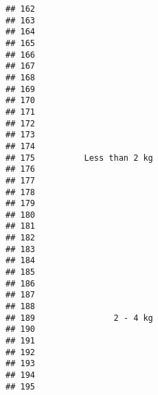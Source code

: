 \documentclass[
]{article}
\begin{document}
\begin{verbatim}
## 162                                                                       
## 163                                                                       
## 164                                                                       
## 165                                                                       
## 166                                                                       
## 167                                                                       
## 168                                                                       
## 169                                                                       
## 170                                                                       
## 171                                                                       
## 172                                                                       
## 173                                                                       
## 174                                                                       
## 175          Less than 2 kg                                               
## 176                                                                       
## 177                                                                       
## 178                                                                       
## 179                                                                       
## 180                                                                       
## 181                                                                       
## 182                                                                       
## 183                                                                       
## 184                                                                       
## 185                                                                       
## 186                                                                       
## 187                                                                       
## 188                                                                       
## 189                2 - 4 kg                                               
## 190                                                                       
## 191                                                                       
## 192                                                                       
## 193                                                                       
## 194                                                                       
## 195                                                                       

\end{verbatim}
\end{document}
